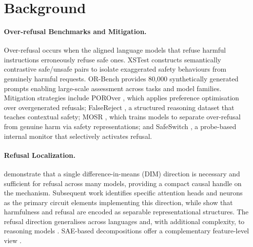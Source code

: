 \documentclass[11pt]{article}
\begin{document}
\FloatBarrier
\section{Background}
\label{sec:background}

\paragraph{Over-refusal Benchmarks and Mitigation.}
Over-refusal occurs when the aligned language models that refuse harmful instructions erroneously refuse safe
ones.
XSTest \citep{rottger2024xstest} constructs semantically contrastive safe/unsafe
pairs to isolate exaggerated safety behaviours from genuinely harmful requests.
OR-Bench \citep{cui2025orbench} provides 80,000 synthetically generated prompts
enabling large-scale assessment across tasks and model families.
Mitigation strategies include POROver \citep{karaman2025porover}, which applies
preference optimisation over overgenerated refusals; FalseReject \citep{falsereject2025},
a structured reasoning dataset that teaches contextual safety; MOSR \citep{levi2025mosr},
which trains models to separate over-refusal from genuine harm via safety representations;
and SafeSwitch \citep{han2025safeswitch}, a probe-based internal monitor that
selectively activates refusal.

\paragraph{Refusal Localization.}
\citet{arditi2024refusal} demonstrate that a single difference-in-means (DIM)
direction is necessary and sufficient for refusal across many models, providing a
compact causal handle on the mechanism.
Subsequent work identifies specific attention heads \citep{zhou2025safety} and
neurons \citep{zhao2025d} as the primary circuit elements implementing this
direction, while \citet{zhao2025refusal} show that harmfulness and refusal are
encoded as separable representational structures.
The refusal direction generalises across languages \citep{wang2025g} and, with
additional complexity, to reasoning models \citep{yin2025refusal}.
SAE-based decompositions offer a complementary feature-level view
\citep{templeton2024scaling,yeo2025sae,goyal2025detox}.
\end{document}
